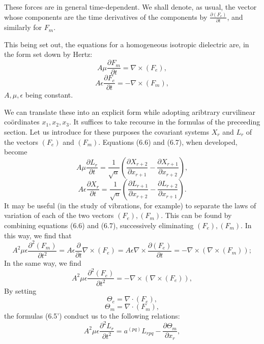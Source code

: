 \documentclass{book}
\begin{document}
These forces are in general time-dependent. We shall denote, as usual, the vector whose components are the time derivatives of the components by $\frac{\partial(F_e)}{\partial t}$, and similarly for $F_m$.

This being set out, the equations for a homogeneous isotropic dielectric are, in the form set down by Hertz:
\begin{equation}
A\mu\frac{\partial F_m}{\partial t}=\nabla\times (F_e),
\end{equation}
\begin{equation}
A\epsilon\frac{\partial F_e}{\partial t}=-\nabla\times (F_m),
\end{equation}
$A,\mu,\epsilon$ being constant.

We can translate these into an explicit form while adopting aribtrary curvilinear co\"ordinates $x_1,x_2,x_3$. It suffices to take recourse in the formulas of the preceeding section. Let us introduce for these purposes the covariant systems $X_r$ and $L_r$ of the vectors $(F_e)$ and $(F_m)$. Equations (6.6) and (6.7), when developed, become
\begin{equation*}
A\mu\frac{\partial L_r}{\partial t}=\frac{1}{\sqrt{a}}\left(\frac{\partial X_{r+2}}{\partial x_{r+1}}-\frac{\partial X_{r+1}}{\partial x_{r+2}}\right),
\tag{6.6'}
\end{equation*}
\begin{equation*}
\tag{6.7'}
A\epsilon\frac{\partial X_r}{\partial t}=\frac{1}{\sqrt{a}}\left(\frac{\partial L_{r+1}}{\partial x_{r+2}}-\frac{\partial L_{r+2}}{\partial x_{r+1}}\right).
\end{equation*}
It may be useful (in the study of vibrations, for example) to separate the laws of variation of each of the two vectors $(F_e), (F_m)$. This can be found by combining equations (6.6) and (6.7), successively eliminating $(F_e), (F_m)$. In this way, we find that
$$A^2\mu\epsilon\frac{\partial^2(F_m)}{\partial t^2}=A\epsilon\frac{\partial}{\partial t}\nabla\times(F_e)=A\epsilon\nabla\times\frac{\partial(F_e)}{\partial t}=-\nabla\times(\nabla\times(F_m));$$
In the same way, we find
$$A^2\mu\epsilon\frac{\partial^2(F_e)}{\partial t^2}=-\nabla\times(\nabla\times(F_e)),$$
By setting
$$\Theta_e=\nabla\cdot(F_e),$$
$$\Theta_m=\nabla\cdot(F_m),$$
the formulas (6.5') conduct us to the following relations:
\begin{equation*}
A^2\mu\epsilon\frac{\partial^2L_r}{\partial t^2}=a^{(pq)}L_{rpq}-\frac{\partial\Theta_m}{\partial x_r},
\tag{6.6''}
\end{equation*}
\end{document}
